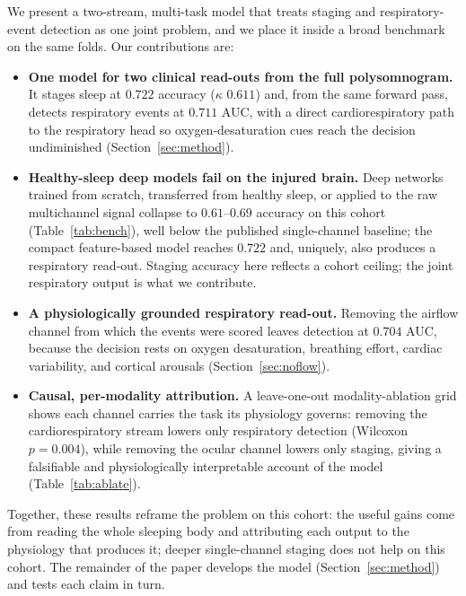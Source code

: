 \documentclass[journal]{IEEEtran}
\newcommand{\mmAcc}{0.722}
\newcommand{\mmK}{0.611}
\newcommand{\mmAuc}{0.711}
\newcommand{\noflowAuc}{0.704}
\begin{document}
We present a two-stream, multi-task model that treats staging and respiratory-event
detection as one joint problem, and we place it inside a broad benchmark on the same folds. Our
contributions are:

\begin{itemize}
\item[\textbf{C1.}] \textbf{One model for two clinical read-outs from the full polysomnogram.} It stages
sleep at $\mmAcc$ accuracy ($\kappa$ $\mmK$) and, from the same forward pass, detects
respiratory events at $\mmAuc$ AUC, with a direct cardiorespiratory path to the respiratory
head so oxygen-desaturation cues reach the decision undiminished (Section~\ref{sec:method}).
\item[\textbf{C2.}] \textbf{Healthy-sleep deep models fail on the injured brain.} Deep networks trained from
scratch, transferred from healthy sleep, or applied to the raw multichannel signal collapse to
$0.61$--$0.69$ accuracy on this cohort (Table~\ref{tab:bench}), well below the published
single-channel baseline; the compact feature-based model reaches $\mmAcc$ and, uniquely, also
produces a respiratory read-out. Staging accuracy here reflects a cohort ceiling; the joint respiratory output is what we contribute.
\item[\textbf{C3.}] \textbf{A physiologically grounded respiratory read-out.}
Removing the airflow channel from which the events were scored leaves detection at
$\noflowAuc$ AUC, because the decision rests on oxygen desaturation, breathing effort,
cardiac variability, and cortical arousals (Section~\ref{sec:noflow}).
\item[\textbf{C4.}] \textbf{Causal, per-modality attribution.} A
leave-one-out modality-ablation grid shows each channel carries the task its physiology governs:
removing the cardiorespiratory stream lowers only respiratory detection (Wilcoxon $p=0.004$),
while removing the ocular channel lowers only staging, giving a falsifiable and physiologically
interpretable account of the model (Table~\ref{tab:ablate}).
\end{itemize}

Together, these results reframe the problem on this cohort: the useful gains come from reading
the whole sleeping body and attributing each output to the physiology that produces it;
deeper single-channel staging does not help on this cohort. The remainder of the paper develops the model
(Section~\ref{sec:method}) and tests each claim in turn.

\end{document}

